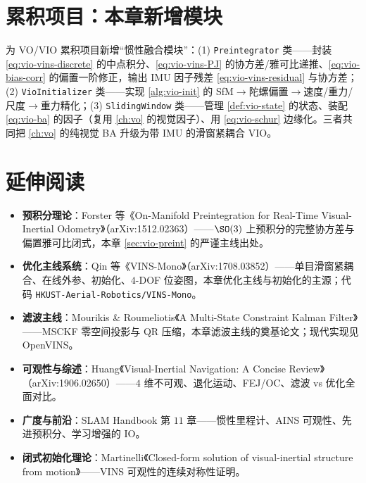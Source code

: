 \section*{累积项目：本章新增模块}
为 VO/VIO 累积项目新增“惯性融合模块”：(1) \texttt{Preintegrator} 类——封装 \cref{eq:vio-vins-discrete} 的中点积分、\cref{eq:vio-vins-PJ} 的协方差/雅可比递推、\cref{eq:vio-bias-corr} 的偏置一阶修正，输出 IMU 因子残差 \cref{eq:vio-vins-residual} 与协方差；(2) \texttt{VioInitializer} 类——实现 \cref{alg:vio-init} 的 SfM$\to$陀螺偏置$\to$速度/重力/尺度$\to$重力精化；(3) \texttt{SlidingWindow} 类——管理 \cref{def:vio-state} 的状态、装配 \cref{eq:vio-ba} 的因子（复用 \cref{ch:vo} 的视觉因子）、用 \cref{eq:vio-schur} 边缘化。三者共同把 \cref{ch:vo} 的纯视觉 BA 升级为带 IMU 的滑窗紧耦合 VIO。

\section*{延伸阅读}
\begin{itemize}
  \item \textbf{预积分理论}：Forster 等《On-Manifold Preintegration for Real-Time Visual-Inertial Odometry》\cite{forster2017preintegration}（arXiv:1512.02363）——$\SO(3)$ 上预积分的完整协方差与偏置雅可比闭式，本章 \cref{sec:vio-preint} 的严谨主线出处。
  \item \textbf{优化主线系统}：Qin 等《VINS-Mono》\cite{qin2018vins}（arXiv:1708.03852）——单目滑窗紧耦合、在线外参、初始化、$4$-DOF 位姿图，本章优化主线与初始化的主源；代码 \texttt{HKUST-Aerial-Robotics/VINS-Mono}。
  \item \textbf{滤波主线}：Mourikis \& Roumeliotis《A Multi-State Constraint Kalman Filter》\cite{mourikis2007msckf}——MSCKF 零空间投影与 QR 压缩，本章滤波主线的奠基论文；现代实现见 OpenVINS。
  \item \textbf{可观性与综述}：Huang《Visual-Inertial Navigation: A Concise Review》\cite{huang2019vins}（arXiv:1906.02650）——$4$ 维不可观、退化运动、FEJ/OC、滤波 vs 优化全面对比。
  \item \textbf{广度与前沿}：SLAM Handbook 第 $11$ 章\cite{carlone2026handbook}——惯性里程计、AINS 可观性、先进预积分、学习增强的 IO。
  \item \textbf{闭式初始化理论}：Martinelli《Closed-form solution of visual-inertial structure from motion》\cite{martinelli2014closed}——VINS 可观性的连续对称性证明。
\end{itemize}

